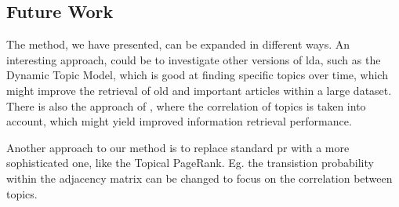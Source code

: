 \subsection{Future Work}\label{sec:future_work}

The method, we have presented, can be expanded in different ways. 
An interesting approach, could be to investigate other versions of \gls{lda}, such as the Dynamic Topic Model\cite{blei2006dynamic}, which is good at finding specific topics over time, which might improve the retrieval of old and important articles within a large dataset.
There is also the approach of \cite{blei2007correlated}, where the correlation of topics is taken into account, which might yield improved information retrieval performance.

Another approach to our method is to replace standard \gls{pr} with a more sophisticated one, like the Topical PageRank\cite{yang2009topic}. 
Eg. the transistion probability within the adjacency matrix can be changed to focus on the correlation between topics.
